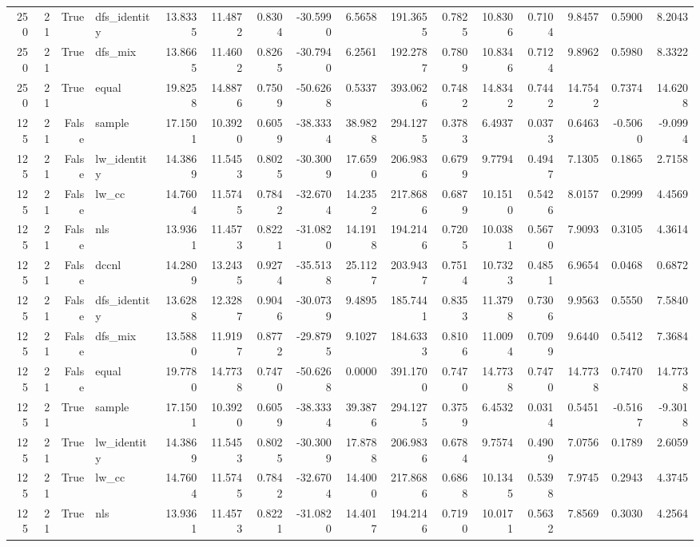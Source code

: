\begin{tabular}{rrrlrrrrrrrrrrrr}
250 & 21 & True & dfs_identity & 13.8335 & 11.4872 & 0.8304 & -30.5990 & 6.5658 & 191.3655 & 0.7825 & 10.8306 & 0.7104 & 9.8457 & 0.5900 & 8.2043 \\
250 & 21 & True & dfs_mix & 13.8665 & 11.4602 & 0.8265 & -30.7940 & 6.2561 & 192.2787 & 0.7809 & 10.8346 & 0.7124 & 9.8962 & 0.5980 & 8.3322 \\
250 & 21 & True & equal & 19.8258 & 14.8876 & 0.7509 & -50.6268 & 0.5337 & 393.0626 & 0.7482 & 14.8342 & 0.7442 & 14.7542 & 0.7374 & 14.6208 \\
125 & 21 & False & sample & 17.1501 & 10.3920 & 0.6059 & -38.3334 & 38.9828 & 294.1275 & 0.3783 & 6.4937 & 0.0373 & 0.6463 & -0.5060 & -9.0994 \\
125 & 21 & False & lw_identity & 14.3869 & 11.5453 & 0.8025 & -30.3009 & 17.6590 & 206.9836 & 0.6799 & 9.7794 & 0.4947 & 7.1305 & 0.1865 & 2.7158 \\
125 & 21 & False & lw_cc & 14.7604 & 11.5745 & 0.7842 & -32.6704 & 14.2352 & 217.8686 & 0.6879 & 10.1510 & 0.5426 & 8.0157 & 0.2999 & 4.4569 \\
125 & 21 & False & nls & 13.9361 & 11.4573 & 0.8221 & -31.0820 & 14.1918 & 194.2146 & 0.7205 & 10.0381 & 0.5670 & 7.9093 & 0.3105 & 4.3614 \\
125 & 21 & False & dccnl & 14.2809 & 13.2435 & 0.9274 & -35.5138 & 25.1127 & 203.9437 & 0.7514 & 10.7323 & 0.4851 & 6.9654 & 0.0468 & 0.6872 \\
125 & 21 & False & dfs_identity & 13.6288 & 12.3287 & 0.9046 & -30.0739 & 9.4895 & 185.7441 & 0.8353 & 11.3798 & 0.7306 & 9.9563 & 0.5550 & 7.5840 \\
125 & 21 & False & dfs_mix & 13.5880 & 11.9197 & 0.8772 & -29.8795 & 9.1027 & 184.6333 & 0.8106 & 11.0094 & 0.7099 & 9.6440 & 0.5412 & 7.3684 \\
125 & 21 & False & equal & 19.7780 & 14.7738 & 0.7470 & -50.6268 & 0.0000 & 391.1700 & 0.7470 & 14.7738 & 0.7470 & 14.7738 & 0.7470 & 14.7738 \\
125 & 21 & True & sample & 17.1501 & 10.3920 & 0.6059 & -38.3334 & 39.3876 & 294.1275 & 0.3759 & 6.4532 & 0.0314 & 0.5451 & -0.5167 & -9.3018 \\
125 & 21 & True & lw_identity & 14.3869 & 11.5453 & 0.8025 & -30.3009 & 17.8788 & 206.9836 & 0.6784 & 9.7574 & 0.4909 & 7.0756 & 0.1789 & 2.6059 \\
125 & 21 & True & lw_cc & 14.7604 & 11.5745 & 0.7842 & -32.6704 & 14.4000 & 217.8686 & 0.6868 & 10.1345 & 0.5398 & 7.9745 & 0.2943 & 4.3745 \\
125 & 21 & True & nls & 13.9361 & 11.4573 & 0.8221 & -31.0820 & 14.4017 & 194.2146 & 0.7190 & 10.0171 & 0.5632 & 7.8569 & 0.3030 & 4.2564 \\

\end{tabular}

